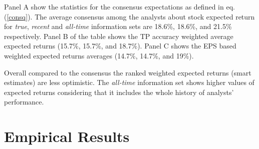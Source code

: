 \documentclass{book}
\newcommand{\tr}{\textit{true}}
\newcommand{\naive}{\textit{recent}}
\newcommand{\default}{\textit{all-time}}
\begin{document}
Panel A show the statistics for the consensus expectations as defined in eq. (\ref{consq}). The average consensus among the analysts about stock expected return for \tr{}, \naive{} and \default{} information sets are 18.6\%, 18.6\%, and 21.5\% respectively. Panel B of the table shows the TP accuracy weighted average expected returns (15.7\%, 15.7\%, and 18.7\%). Panel C shows the EPS based weighted expected returns averages (14.7\%, 14.7\%, and 19\%). 

Overall compared to the consensus the ranked weighted expected returns (smart estimates) are less optimistic. The \default{} information set shows higher values of expected returns considering that it includes the whole history of analysts' performance.





\section{Empirical Results}
\label{sec:results}
\end{document}
